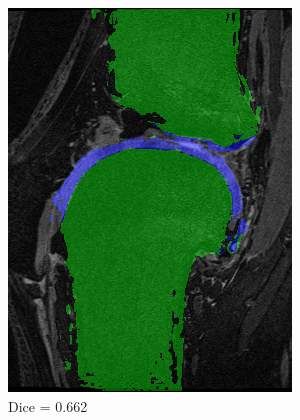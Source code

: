 \documentclass[a4paper,12pt]{article}
\begin{document}
\begin{figure}[H]
    \centering

    \begin{subfigure}[b]{0.32\linewidth}
    \includegraphics[width=\linewidth]{final_SRC_worst.png}
    \caption{Dice = 0.662}
    \end{subfigure}
    \begin{subfigure}[b]{0.32\linewidth}

\end{subfigure}
\end{figure}
\end{document}
